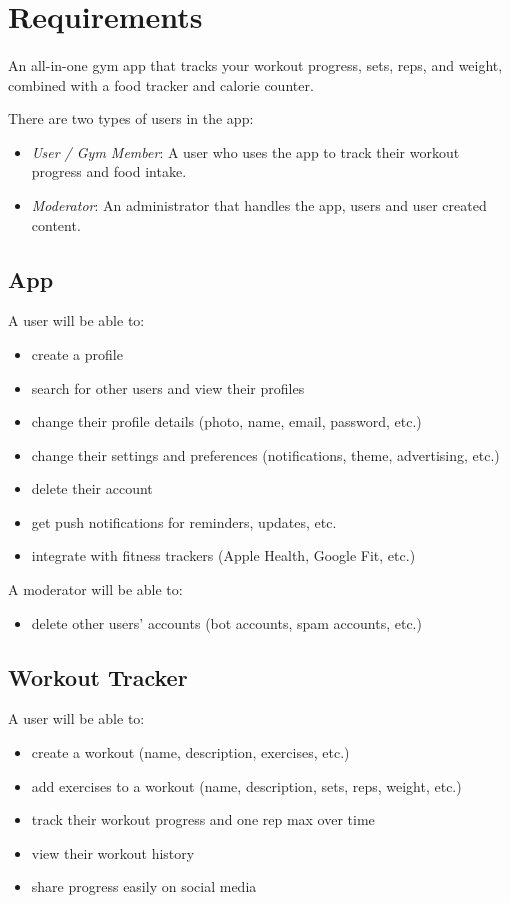 
\section{Requirements}

\paragraph{}
An all-in-one gym app that tracks your workout progress, sets, reps, and weight, combined with a food tracker and calorie counter.

There are two types of users in the app:
\begin{itemize}
  \item \textit{User / Gym Member}: A user who uses the app to track their workout progress and food intake.
  \item \textit{Moderator}: An administrator that handles the app, users and user created content.
\end{itemize}

\subsection{App}
A user will be able to:
\begin{itemize}
  \item create a profile
  \item search for other users and view their profiles
  \item change their profile details (photo, name, email, password, etc.)
  \item change their settings and preferences (notifications, theme, advertising, etc.)
  \item delete their account
  \item get push notifications for reminders, updates, etc.
  \item integrate with fitness trackers (Apple Health, Google Fit, etc.)
\end{itemize}
A moderator will be able to:
\begin{itemize}
  \item delete other users' accounts (bot accounts, spam accounts, etc.)
\end{itemize}

\subsection{Workout Tracker}
A user will be able to:
\begin{itemize}
  \item create a workout (name, description, exercises, etc.)
  \item add exercises to a workout (name, description, sets, reps, weight, etc.)
  \item track their workout progress and one rep max over time
  \item view their workout history
  \item share progress easily on social media
\end{itemize}

